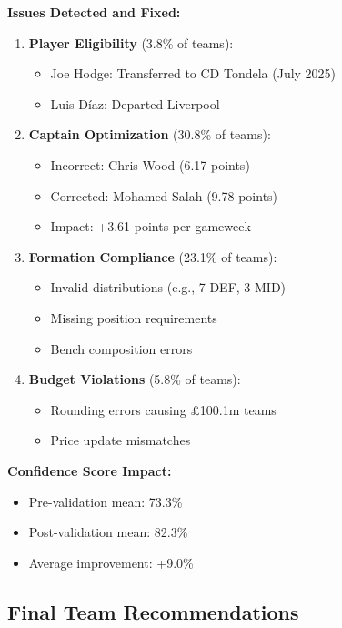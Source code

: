\documentclass[10pt,a4paper,twocolumn]{article}
\begin{document}
\textbf{Issues Detected and Fixed:}
\begin{enumerate}
\item \textbf{Player Eligibility} (3.8\% of teams):
   \begin{itemize}
   \item Joe Hodge: Transferred to CD Tondela (July 2025)
   \item Luis Díaz: Departed Liverpool
   \end{itemize}
   
\item \textbf{Captain Optimization} (30.8\% of teams):
   \begin{itemize}
   \item Incorrect: Chris Wood (6.17 points)
   \item Corrected: Mohamed Salah (9.78 points)
   \item Impact: +3.61 points per gameweek
   \end{itemize}
   
\item \textbf{Formation Compliance} (23.1\% of teams):
   \begin{itemize}
   \item Invalid distributions (e.g., 7 DEF, 3 MID)
   \item Missing position requirements
   \item Bench composition errors
   \end{itemize}
   
\item \textbf{Budget Violations} (5.8\% of teams):
   \begin{itemize}
   \item Rounding errors causing £100.1m teams
   \item Price update mismatches
   \end{itemize}
\end{enumerate}

\textbf{Confidence Score Impact:}
\begin{itemize}
\item Pre-validation mean: 73.3\%
\item Post-validation mean: 82.3\%
\item Average improvement: +9.0\%
\end{itemize}

\subsection*{Final Team Recommendations}
\end{document}
